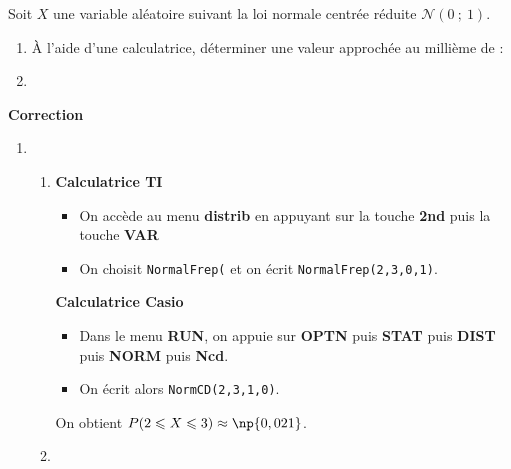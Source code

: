 \documentclass{cornouaille}
\begin{document}
\begin{methode}

\exercice

Soit $X$ une variable aléatoire suivant la loi normale centrée réduite $\mathcal{N}(0\ ;\ 1)$.
\begin{enumerate}
\item \`A l'aide d'une calculatrice, déterminer une valeur approchée au millième de :
\item
{}
\end{enumerate}

\textbf{Correction}
\begin{enumerate}
\item \begin{enumerate}
        \item \begin{multicols}{2}
\textcolor{H1}{\bfseries Calculatrice TI}
\begin{itemize}
  \item On accède au menu \textbf{distrib} en appuyant sur la touche \textbf{2nd}
   puis la touche \textbf{VAR}
  \item On choisit \verb"NormalFrep(" et on écrit \verb"NormalFrep(2,3,0,1)".
\end{itemize}\columnbreak


\textcolor{H1}{\bfseries Calculatrice Casio}
\begin{itemize}
  \item Dans le menu \textbf{RUN}, on appuie sur \textbf{OPTN} 
 puis \textbf{STAT} puis \textbf{DIST} puis \textbf{NORM} puis \textbf{Ncd}.
  \item On écrit alors \verb"NormCD(2,3,1,0)".
\end{itemize}
\end{multicols}
On obtient  $P(2\leqslant X\leqslant 3)\approx\np{0,021}$.
\item ~~


\end{enumerate}
\end{enumerate}
\end{methode}
\end{document}
